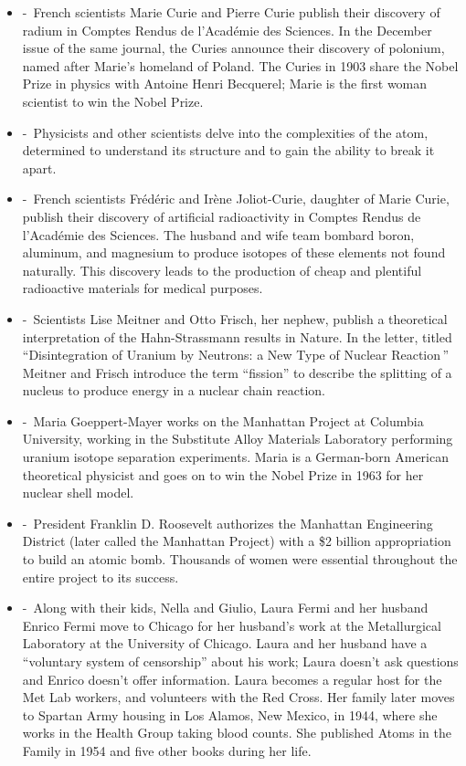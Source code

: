 \documentclass[12pt,a4paper]{article}
\begin{document}
\begin{enumerate}
    \begin{itemize}
      \item[]  -\ French scientists Marie Curie and Pierre Curie publish their discovery of radium in Comptes Rendus de l'Académie des Sciences. In the December issue of the same journal, the Curies announce their discovery of polonium, named after Marie's homeland of Poland. The Curies in 1903 share the Nobel Prize in physics with Antoine Henri Becquerel; Marie is the first woman scientist to win the Nobel Prize.
      \item[]  -\ Physicists and other scientists delve into the complexities of the atom, determined to understand its structure and to gain the ability to break it apart.
      \item[]  -\ French scientists Frédéric and Irène Joliot-Curie, daughter of Marie Curie, publish their discovery of artificial radioactivity in Comptes Rendus de l'Académie des Sciences. The husband and wife team bombard boron, aluminum, and magnesium to produce isotopes of these elements not found naturally. This discovery leads to the production of cheap and plentiful radioactive materials for medical purposes.
      \item[]  -\ Scientists Lise Meitner and Otto Frisch, her nephew, publish a theoretical interpretation of the Hahn-Strassmann results in Nature. In the letter, titled ``Disintegration of Uranium by Neutrons: a New Type of Nuclear Reaction\,'' Meitner and Frisch introduce the term ``fission'' to describe the splitting of a nucleus to produce energy in a nuclear chain reaction.
      \item[]  -\ Maria Goeppert-Mayer works on the Manhattan Project at Columbia University, working in the Substitute Alloy Materials Laboratory performing uranium isotope separation experiments. Maria is a German-born American theoretical physicist and goes on to win the Nobel Prize in 1963 for her nuclear shell model.
      \item[]  -\ President Franklin D. Roosevelt authorizes the Manhattan Engineering District (later called the Manhattan Project) with a \$2 billion appropriation to build an atomic bomb. Thousands of women were essential throughout the entire project to its success.
      \item[]  -\ Along with their kids, Nella and Giulio, Laura Fermi and her husband Enrico Fermi move to Chicago for her husband's work at the Metallurgical Laboratory at the University of Chicago. Laura and her husband have a ``voluntary system of censorship'' about his work; Laura doesn't ask questions and Enrico doesn't offer information. Laura becomes a regular host for the Met Lab workers, and volunteers with the Red Cross. Her family later moves to Spartan Army housing in Los Alamos, New Mexico, in 1944, where she works in the Health Group taking blood counts. She published Atoms in the Family in 1954 and five other books during her life.

\end{itemize}
\end{enumerate}
\end{document}
